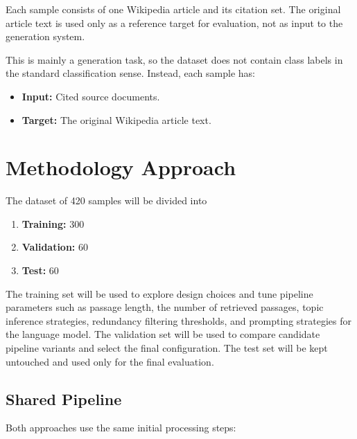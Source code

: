 \documentclass[10pt,a4paper]{article}
\begin{document}
Each sample consists of one Wikipedia article and its citation set. The original article text is used only as a reference target for evaluation, not as input to the generation system.

This is mainly a generation task, so the dataset does not contain class labels in the standard classification sense. Instead, each sample has:
\begin{itemize}
    \item \textbf{Input:} Cited source documents.
    \item \textbf{Target:} The original Wikipedia article text.
\end{itemize}

\section{Methodology Approach}

The dataset of 420 samples will be divided into
\begin{enumerate}
    \item \textbf{Training:} 300
    \item \textbf{Validation:} 60
    \item \textbf{Test:} 60
\end{enumerate}

The training set will be used to explore design choices and tune pipeline parameters such as passage length, the number of retrieved passages, topic inference strategies, redundancy filtering thresholds, and prompting strategies for the language model. The validation set will be used to compare candidate pipeline variants and select the final configuration. The test set will be kept untouched and used only for the final evaluation.

\subsection*{Shared Pipeline}

Both approaches use the same initial processing steps:
\end{document}

